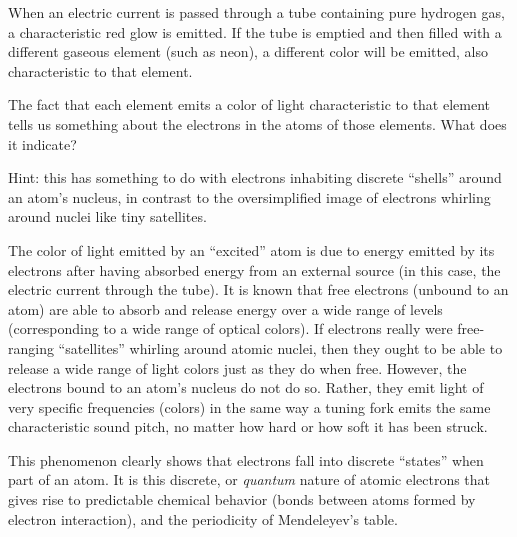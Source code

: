 

When an electric current is passed through a tube containing pure hydrogen gas, a characteristic red glow is emitted.  If the tube is emptied and then filled with a different gaseous element (such as neon), a different color will be emitted, also characteristic to that element.

The fact that each element emits a color of light characteristic to that element tells us something about the electrons in the atoms of those elements.  What does it indicate?  

\vskip 10pt

Hint: this has something to do with electrons inhabiting discrete ``shells'' around an atom's nucleus, in contrast to the oversimplified image of electrons whirling around nuclei like tiny satellites.







The color of light emitted by an ``excited'' atom is due to energy emitted by its electrons after having absorbed energy from an external source (in this case, the electric current through the tube).  It is known that free electrons (unbound to an atom) are able to absorb and release energy over a wide range of levels (corresponding to a wide range of optical colors).  If electrons really were free-ranging ``satellites'' whirling around atomic nuclei, then they ought to be able to release a wide range of light colors just as they do when free.  However, the electrons bound to an atom's nucleus do not do so.  Rather, they emit light of very specific frequencies (colors) in the same way a tuning fork emits the same characteristic sound pitch, no matter how hard or how soft it has been struck.

This phenomenon clearly shows that electrons fall into discrete ``states'' when part of an atom.  It is this discrete, or {\it quantum} nature of atomic electrons that gives rise to predictable chemical behavior (bonds between atoms formed by electron interaction), and the periodicity of Mendeleyev's table.










